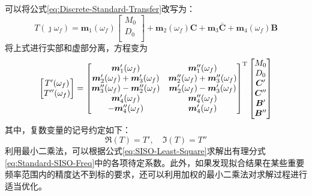 可以将公式\eqref{eq:Discrete-Standard-Transfer}改写为：
\begin{equation}
	T(\jmath \omega_f)=\boldsymbol{m}_1(\omega_f)\left[ 
	\begin{matrix} 
	M_0 \\
	D_0 \\
	\end{matrix} \right] + \boldsymbol{m}_2(\omega_f)\boldsymbol{C} + \boldsymbol{m}_3\boldsymbol{\bar{C}} +\boldsymbol{m}_4(\omega_f)\boldsymbol{B}
\end{equation}
将上式进行实部和虚部分离，方程变为
\begin{equation}
	\label{eq:SISO-Least-Square}
	\left[ \begin{matrix}
	   T'(\omega_f)  \\
	   T''(\omega_f)  \\
	\end{matrix} \right]=\left[ \begin{matrix}
		\boldsymbol{m}'_1(\omega_f) & \boldsymbol{m}''_1(\omega_f) \\
		\boldsymbol{m}'_2(\omega_f)+ \boldsymbol{m}'_3(\omega_f) & \boldsymbol{m}''_2(\omega_f)+ \boldsymbol{m}''_3(\omega_f) \\
		\boldsymbol{m}''_3(\omega_f)- \boldsymbol{m}''_2(\omega_f) & \boldsymbol{m}'_2(\omega_f)-\boldsymbol{m}'_3(\omega_f) \\
		\boldsymbol{m}'_4(\omega_f) & \boldsymbol{m}''_4(\omega_f) \\
		-\boldsymbol{m}''_4(\omega_f) & \boldsymbol{m}'_4(\omega_f)
	\end{matrix} \right]^{\ut} \left[ \begin{matrix}
	   M_0  \\
	   D_0  \\
	   \boldsymbol{C}'  \\
	   \boldsymbol{C}''  \\
	   \boldsymbol{B}'  \\
	   \boldsymbol{B}''  \\
	\end{matrix} \right]
\end{equation}
其中，复数变量的记号约定如下：
\begin{equation}
	\Re(T)=T',\quad\Im(T)=T''
\end{equation}
利用最小二乘法\cite{Bjorck:1996}，可以根据公式\eqref{eq:SISO-Least-Square}求解出有理分式\eqref{eq:Standard-SISO-Freq}中的各项待定系数。此外，如果发现拟合结果在某些重要频率范围内的精度达不到标的要求，还可以利用加权的最小二乘法\cite{Strutz:2011}对求解过程进行适当优化。


